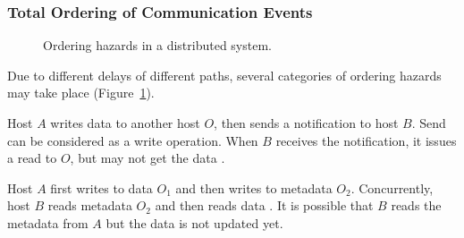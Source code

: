 \subsubsection{Total Ordering of Communication Events}
\label{subsec:order-hazards}

\begin{figure}[t]
\centering
    \hspace{0.02\textwidth}
	\caption{Ordering hazards in a distributed system.}
	\label{fig:ordering}
\end{figure}


 Due to different delays of different paths, several categories of ordering hazards~\cite{gharachorloo1990memory,sewell2010x86} may take place (Figure~\ref{fig:ordering}).

Host $A$ writes data to another host $O$, then sends a notification to host $B$. Send can be considered as a write operation.
When $B$ receives the notification, it issues a read to $O$, but may not get the data .

Host $A$ first writes to data $O_1$ and then writes to metadata $O_2$. Concurrently, host $B$ reads metadata $O_2$ and then reads data .
It is possible that $B$ reads the metadata from $A$ but the data is not updated yet.

